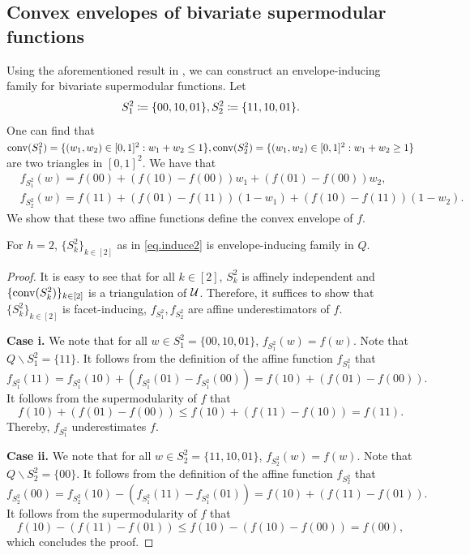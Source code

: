 \subsection{Convex envelopes of bivariate supermodular functions}

 
 Using the aforementioned result in , we can construct an envelope-inducing family for bivariate supermodular functions. Let 
\begin{equation}
\label{eq.induce2}
    S^2_1 \coloneqq \{00,10,01\}, S^2_2 \coloneqq 
     \{11,10,01\}.
\end{equation}
One can find that $\operatorname{conv}(S^2_1)=\{(w_1,w_2) \in [0,1]^2:w_1 + w_2 \le 1 \}, \operatorname{conv}(S^2_2)=\{(w_1,w_2) \in [0,1]^2: w_1 + w_2 \ge 1 \}$ are two triangles in $[0,1]^2$.  We have that 
     	\begin{align*}
    	& f_{S^2_1}(w) =  f(00) + (f(10) -f(00)) w_1 + (f(01) -f(00)) w_2,\\
    	& f_{S^2_2}(w) = f(11) + (f(01) -f(11)) (1 - w_1) + (f(10) -f(11)) (1 - w_2).
	\end{align*}
 We show that these two affine functions define the convex envelope of $f$.
 
 \begin{theorem}
     For $h = 2$, $\{S^2_k\}_{k \in [2]}$ as in \eqref{eq.induce2}  is  envelope-inducing family in $Q$.
 \end{theorem}
 \begin{proof}
 It is easy to see that for all $k \in [2]$, $S^2_k$ is affinely independent and $\{\operatorname{conv}(S^2_k)\}_{k \in [2]}$ is a triangulation of $\mathcal U$.  Therefore, it suffices to show that $\{S^2_k\}_{k \in [2]}$  is facet-inducing, \ie $f_{S^2_1}, f_{S^2_2}$ are affine underestimators of $f$. 
 
 \textbf{Case i.}
 We note that for all $w \in S^2_1 = \{00,10,01\}$, $f_{S^2_1}(w) = f(w).$ Note that $Q\smallsetminus S^2_1 = \{11\}.$ It follows from the definition of the affine function $f_{S^2_1}$  that
 \begin{equation*}
     f_{S^2_1}(11)= f_{S^2_1}(10) + (f_{S^2_1}(01) - f_{S^2_1}(00)) = f(10) + (f(01) - f(00)).
 \end{equation*}
 It follows from the supermodularity of $f$ that 
 \begin{equation*}
     f(10) + (f(01) - f(00)) \le  f(10) + (f(11) - f(10)) = f(11).
 \end{equation*}
 Thereby, $f_{S^2_1}$ underestimates $f$.

  \textbf{Case ii.}
 We note that for all $w \in S^2_2 = \{11,10,01\}$, $f_{S^2_2}(w) = f(w).$  Note that $Q\smallsetminus S^2_2 = \{00\}.$ It follows from the definition of the affine function $f_{S^2_2}$  that
 \begin{equation*}
     f_{S^2_2}(00)= f_{S^2_2}(10) - (f_{S^2_1}(11) - f_{S^2_1}(01)) = f(10) + (f(11) - f(01)).
 \end{equation*}
 It follows from the supermodularity of $f$ that 
 \begin{equation*}
     f(10) - (f(11) - f(01)) \le  f(10) - (f(10) - f(00)) = f(00),
 \end{equation*}
which concludes the proof.
 \end{proof}



